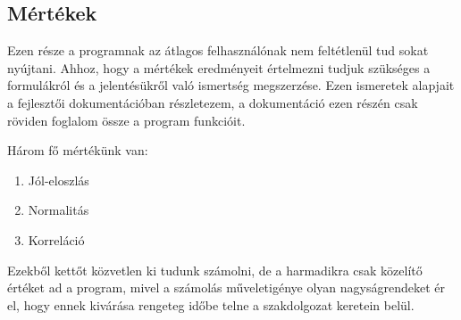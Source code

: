 \documentclass[hidelinks, 12pt]{article}
\begin{document}
	\subsection{Mértékek}
	Ezen része a programnak az átlagos felhasználónak nem feltétlenül tud sokat nyújtani. Ahhoz, hogy a mértékek eredményeit értelmezni tudjuk szükséges a formulákról és a jelentésükről való ismertség megszerzése. Ezen ismeretek alapjait a fejlesztői dokumentációban részletezem, a dokumentáció ezen részén csak röviden foglalom össze a program funkcióit.
	
	Három fő mértékünk van:
	\begin{enumerate}
		\bfseries \item Jól-eloszlás
		\bfseries \item Normalitás 
		\bfseries \item Korreláció
	\end{enumerate}
	Ezekből kettőt közvetlen ki tudunk számolni, de a harmadikra csak közelítő értéket ad a program, mivel a számolás műveletigénye olyan nagyságrendeket ér el, hogy ennek kivárása rengeteg időbe telne a szakdolgozat keretein belül.
	
\end{document}
